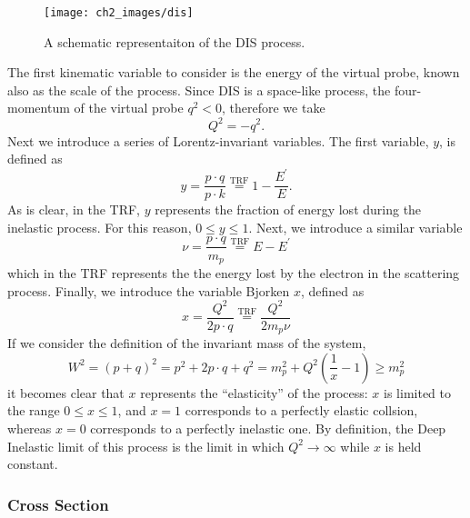 \documentclass[10pt,a4paper]{book}
\begin{document}
\begin{figure}
\centering
\texttt{[image: ch2\_images/dis]}
\caption{A schematic representaiton of the DIS process.}
\label{DIS diagram}
\end{figure}

The first kinematic variable to consider is the energy of the virtual probe, known also as the scale of the process. Since DIS is a space-like process, the four-momentum of the virtual probe $q^2 < 0$, therefore we take
\begin{equation}
Q^2 = -q^2.
\end{equation}
Next we introduce a series of Lorentz-invariant variables. The first variable, $y$, is defined as
\begin{equation}
y = \frac{p\cdot q}{p\cdot k} \overset{\mathrm{TRF}}{=} 1 - \frac{E^\prime}{E}.
\end{equation}
As is clear, in the TRF, $y$ represents the fraction of energy lost during the inelastic process. For this reason, $0 \leq y \leq 1$.
Next, we introduce a similar variable
\begin{equation}
\nu = \frac{p\cdot q}{m_p} \overset{\mathrm{TRF}}{=} E - E^\prime
\end{equation}
which in the TRF represents the the energy lost by the electron in the scattering process.
Finally, we introduce the variable Bjorken $x$, defined as
\begin{equation}
x = \frac{Q^2}{2p\cdot q} \overset{\mathrm{TRF}}{=} \frac{Q^2}{2m_p\nu}
\end{equation} 
If we consider the definition of the invariant mass of the system,
\begin{equation}
W^2 = (p + q)^2 = p^2 + 2p\cdot q + q^2 = m_p^2 + Q^2\left(\frac{1}{x} - 1\right) \geq m_p^2
\end{equation}
it becomes clear that $x$ represents the ``elasticity'' of the process: $x$ is limited to the range $0 \leq x \leq 1$, and $x = 1$ corresponds to a perfectly elastic collsion, whereas $x = 0$ corresponds to a perfectly inelastic one. By definition, the Deep Inelastic limit of this process is the limit in which $Q^2 \rightarrow \infty$ while $x$ is held constant.
 
\subsubsection{Cross Section}
\end{document}

